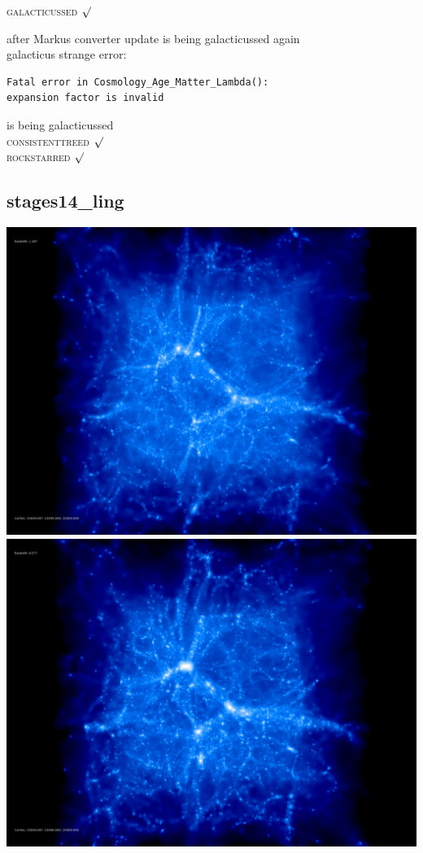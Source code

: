 \textsc{galacticussed} $\surd$

after Markus converter update 
is being galacticussed again \\
galacticus strange error: 
\begin{verbatim}
Fatal error in Cosmology_Age_Matter_Lambda():
expansion factor is invalid
\end{verbatim}
is being galacticussed \\
\textsc{consistenttreed} $\surd$ \\ 
\textsc{rockstarred} $\surd$

% 
%
%
%
%
%
%
%


\newpage
\subsection{stages14\_ling}

\includegraphics[scale=0.1]{r256/stages14_ling/50.jpg} 
\includegraphics[scale=0.1]{r256/stages14_ling/100.jpg}  \\

